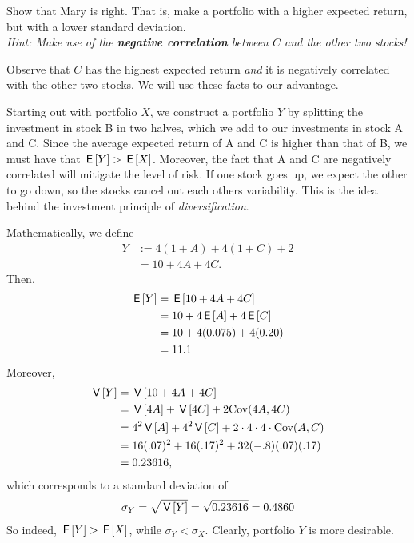 \documentclass[lectures]{subfiles}
\begin{document}
\begin{exercise}
Show that Mary is right. That is, make a portfolio with a higher expected return, but with a lower standard deviation. \\
\textit{Hint: Make use of the \textbf{negative correlation} between $C$ and the other two stocks!}
\begin{solution}
Observe that $C$ has the highest expected return \textit{and} it is negatively correlated with the other two stocks. We will use these facts to our advantage.

Starting out with portfolio $X$, we construct a portfolio $Y$ by splitting the investment in stock B in two halves, which we add to our investments in stock A and C. Since the average expected return of A and C is higher than that of B, we must have that $\,\mathsf{E}\left[Y\right] > \,\mathsf{E}\left[X\right]$. Moreover, the fact that A and C are negatively correlated will mitigate the level of risk. If one stock goes up, we expect the other to go down, so the stocks cancel out each others variability. This is the idea behind the investment principle of \textit{diversification}.

Mathematically, we define
\begin{align}
    Y &:= 4(1 + A) + 4(1 + C) + 2 \\
    &= 10 + 4A + 4C.
\end{align}
Then,
\begin{align}
    \,\mathsf{E}\left[Y\right] &= \,\mathsf{E}\left[10 + 4A + 4C\right] \\
    &= 10 + 4\,\mathsf{E}\left[A\right] + 4\,\mathsf{E}\left[C\right] \\
    &= 10 + 4(0.075) + 4(0.20) \\
    &= 11.1
\end{align}
Moreover,
\begin{align}
    \,\mathsf{V}\left[Y\right] &= \,\mathsf{V}\left[10 + 4A + 4C\right] \\
    &= \,\mathsf{V}\left[4A\right] + \,\mathsf{V}\left[4C\right] + 2 \text{Cov}(4A, 4C)\\
    &= 4^2\,\mathsf{V}\left[A\right] + 4^2 \,\mathsf{V}\left[C\right] +2 \cdot  4 \cdot 4 \cdot \text{Cov}(A,C) \\
    &= 16 (.07)^2 + 16 (.17)^2  + 32 (-.8)(.07)(.17) \\
    &= 0.23616,
\end{align}
which corresponds to a standard deviation of
\begin{align}
    \sigma_Y = \sqrt{\,\mathsf{V}\left[Y\right]} = \sqrt{0.23616} = 0.4860
\end{align}
So indeed, $\,\mathsf{E}\left[Y\right] > \,\mathsf{E}\left[X\right]$, while $\sigma_Y < \sigma_X$. Clearly, portfolio $Y$ is more desirable.
\end{solution}
\end{exercise}
\end{document}
